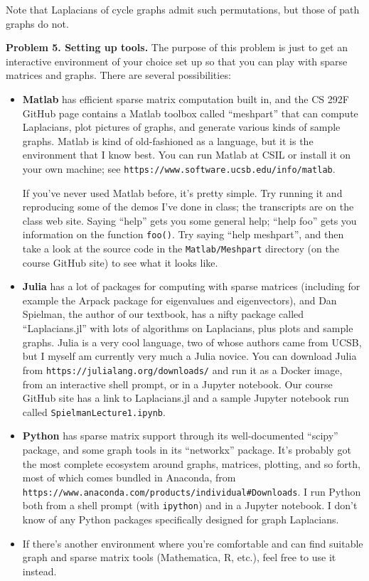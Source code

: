 \documentclass[11pt]{article}
\begin{document}
Note that Laplacians of cycle graphs admit such permutations,
but those of path graphs do not.

\par\bigskip
{\bf Problem 5. Setting up tools.} 
The purpose of this problem is just to get an interactive environment
of your choice set up so that you can play with sparse matrices and
graphs.
There are several possibilities:

\begin{itemize}

\item {\bf Matlab} has efficient sparse matrix computation built in,
and the CS 292F GitHub page contains a Matlab toolbox called ``meshpart''
that can compute Laplacians, plot pictures of graphs, and generate
various kinds of sample graphs. 
Matlab is kind of old-fashioned as a language,
but it is the environment that I know best.
You can run Matlab at CSIL or install it on your own machine;
see {\tt https://www.software.ucsb.edu/info/matlab}.
\par
If you've never used Matlab before, it's pretty simple.
Try running it and reproducing some of the demos I've done in class;
the transcripts are on the class web site.
Saying ``help'' gets you some general help;
``help foo'' gets you information on the function {\tt foo()}.
Try saying ``help meshpart'', and then take a look at
the source code in the {\tt Matlab/Meshpart} directory 
(on the course GitHub site) to see what it looks like.

\item {\bf Julia} has a lot of packages for computing with sparse matrices
(including for example the Arpack package for eigenvalues and eigenvectors),
and Dan Spielman, the author of our textbook, has a nifty package called
``Laplacians.jl'' with lots of algorithms on Laplacians, 
plus plots and sample graphs.
Julia is a very cool language, two of whose authors came from UCSB, 
but I myself am currently very much a Julia novice.
You can download Julia from {\tt https://julialang.org/downloads/} and
run it as a Docker image, from an interactive shell prompt, 
or in a Jupyter notebook. Our course GitHub site has a link to Laplacians.jl 
and a sample Jupyter notebook run called {\tt SpielmanLecture1.ipynb}.

\item {\bf Python} has sparse matrix support through its well-documented
``scipy'' package, and some graph tools in its ``networkx'' package.
It's probably got the most complete ecosystem around graphs, matrices,
plotting, and so forth, most of which comes bundled in Anaconda, from 
{\tt https://www.anaconda.com/products/individual\#Downloads}.
I run Python both from a shell prompt (with {\tt ipython}) and 
in a Jupyter notebook.
I don't know of any Python packages specifically designed for
graph Laplacians.

\item If there's another environment where you're comfortable
and can find suitable graph and sparse matrix tools (Mathematica, R, etc.),
feel free to use it instead.

\end{itemize}
\end{document}
